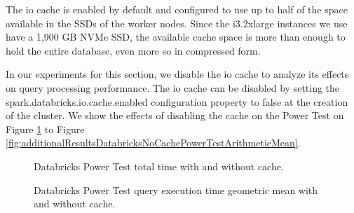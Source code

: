 The io cache is enabled by default and configured to use up to half of the space available in the SSDs of the worker nodes. Since the i3.2xlarge instances we use have a 1,900 GB NVMe SSD, the available cache space is more than enough to hold the entire database, even more so in compressed form.

In our experiments for this section, we disable the io cache to analyze its effects on query processing performance. The io cache can be disabled by setting the spark.databricks.io.cache.enabled configuration property to false at the creation of the cluster. We show the effects of disabling the cache on the Power Test on Figure \ref{fig:additionalResultsDatabricksNoCachePowerTestTotalTime} to Figure \ref{fig:additionalResultsDatabricksNoCachePowerTestArithmeticMean}.

\begin{figure}
   \begin{center}
   \end{center}
   \caption{Databricks Power Test total time with and without cache.}
   \label{fig:additionalResultsDatabricksNoCachePowerTestTotalTime}
\end{figure}

\begin{figure}
   \begin{center}
   \end{center}
   \caption{Databricks Power Test query execution time geometric mean with and without cache.}
   \label{fig:additionalResultsDatabricksNoCachePowerTestGeomean}
\end{figure}

